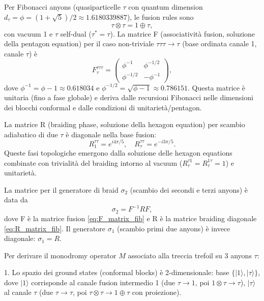 \documentclass[11pt,a4paper]{article}
\theoremstyle{plain}
\theoremstyle{definition}
\begin{document}
Per Fibonacci anyons (quasiparticelle $\tau$ con quantum dimension $d_\tau = \phi = (1 + \sqrt{5})/2 \approx 1.6180339887$), le fusion rules sono
\begin{equation}
\tau \otimes \tau = 1 \oplus \tau,
\label{eq:fib_fusion_explicit}
\end{equation}
con vacuum 1 e $\tau$ self-dual ($\tau^* = \tau$). La matrice F (associatività fusion, soluzione della pentagon equation) per il caso non-triviale $\tau \tau \tau \to \tau$ (base ordinata {canale 1, canale $\tau$}) è
\begin{equation}
F^{\tau \tau \tau}_{\tau} = \begin{pmatrix}
\phi^{-1} & \phi^{-1/2} \\
\phi^{-1/2} & -\phi^{-1}
\end{pmatrix},
\label{eq:F_matrix_fib}
\end{equation}
dove $\phi^{-1} = \phi - 1 \approx 0.618034$ e $\phi^{-1/2} = \sqrt{\phi - 1} \approx 0.786151$. Questa matrice è unitaria (fino a fase globale) e deriva dalle recursioni Fibonacci nelle dimensioni dei blocchi conformal e dalle condizioni di unitarietà/pentagon.

La matrice R (braiding phase, soluzione della hexagon equation) per scambio adiabatico di due $\tau$ è diagonale nella base fusion:
\begin{equation}
R^{\tau \tau}_{1} = e^{i 4\pi / 5}, \quad R^{\tau \tau}_{\tau} = e^{-i 3\pi / 5}.
\label{eq:R_matrix_fib}
\end{equation}
Queste fasi topologiche emergono dalla soluzione delle hexagon equations combinate con trivialità del braiding intorno al vacuum ($R^{\tau 1}_{\tau} = R^{1 \tau}_{\tau} = 1$) e unitarietà.

La matrice per il generatore di braid $\sigma_2$ (scambio dei secondi e terzi anyons) è data da
\begin{equation}
\sigma_2 = F^{-1} R F,
\label{eq:sigma2_matrix}
\end{equation}
dove F è la matrice fusion \eqref{eq:F_matrix_fib} e R è la matrice braiding diagonale \eqref{eq:R_matrix_fib}. Il generatore $\sigma_1$ (scambio primi due anyons) è invece diagonale: $\sigma_1 = R$.

Per derivare il monodromy operator $M$ associato alla treccia trefoil su 3 anyons $\tau$:

1. Lo spazio dei ground states (conformal blocks) è 2-dimensionale: base $\{ |1\rangle, |\tau\rangle \}$, dove $|1\rangle$ corrisponde al canale fusion intermedio 1 (due $\tau \to 1$, poi $1 \otimes \tau \to \tau$), $|\tau\rangle$ al canale $\tau$ (due $\tau \to \tau$, poi $\tau \otimes \tau \to 1 \oplus \tau$ con proiezione).
\end{document}
